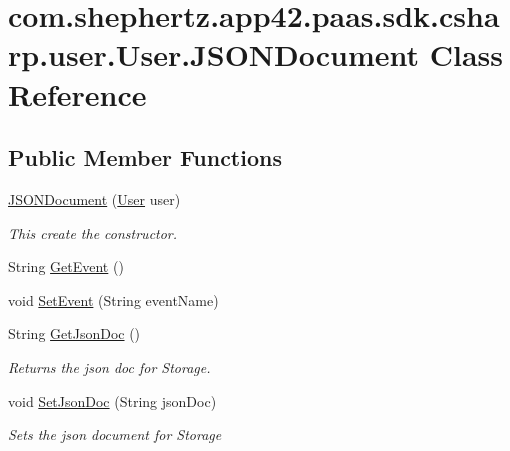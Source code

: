 \hypertarget{classcom_1_1shephertz_1_1app42_1_1paas_1_1sdk_1_1csharp_1_1user_1_1_user_1_1_j_s_o_n_document}{\section{com.\+shephertz.\+app42.\+paas.\+sdk.\+csharp.\+user.\+User.\+J\+S\+O\+N\+Document Class Reference}
\label{classcom_1_1shephertz_1_1app42_1_1paas_1_1sdk_1_1csharp_1_1user_1_1_user_1_1_j_s_o_n_document}
}
\subsection*{Public Member Functions}
\begin{DoxyCompactItemize}
\item 
\hyperlink{classcom_1_1shephertz_1_1app42_1_1paas_1_1sdk_1_1csharp_1_1user_1_1_user_1_1_j_s_o_n_document_a9e429982425fdcaafc2c9c259ed5e28e}{J\+S\+O\+N\+Document} (\hyperlink{classcom_1_1shephertz_1_1app42_1_1paas_1_1sdk_1_1csharp_1_1user_1_1_user}{User} user)
\begin{DoxyCompactList}\small\item\em This create the constructor. \end{DoxyCompactList}\item 
String \hyperlink{classcom_1_1shephertz_1_1app42_1_1paas_1_1sdk_1_1csharp_1_1user_1_1_user_1_1_j_s_o_n_document_a9f6409e0a1f05765f9953e4a962f4b1b}{Get\+Event} ()
\item 
void \hyperlink{classcom_1_1shephertz_1_1app42_1_1paas_1_1sdk_1_1csharp_1_1user_1_1_user_1_1_j_s_o_n_document_ae811a5ff68f40991343e70a78341d951}{Set\+Event} (String event\+Name)
\item 
String \hyperlink{classcom_1_1shephertz_1_1app42_1_1paas_1_1sdk_1_1csharp_1_1user_1_1_user_1_1_j_s_o_n_document_aaafbb84245d3417e8e2988cef79591a1}{Get\+Json\+Doc} ()
\begin{DoxyCompactList}\small\item\em Returns the json doc for Storage. \end{DoxyCompactList}\item 
void \hyperlink{classcom_1_1shephertz_1_1app42_1_1paas_1_1sdk_1_1csharp_1_1user_1_1_user_1_1_j_s_o_n_document_a29d8da1792c524bbf628ffc40b7f06c8}{Set\+Json\+Doc} (String json\+Doc)
\begin{DoxyCompactList}\small\item\em Sets the json document for Storage \end{DoxyCompactList}\item 

\end{DoxyCompactItemize}
